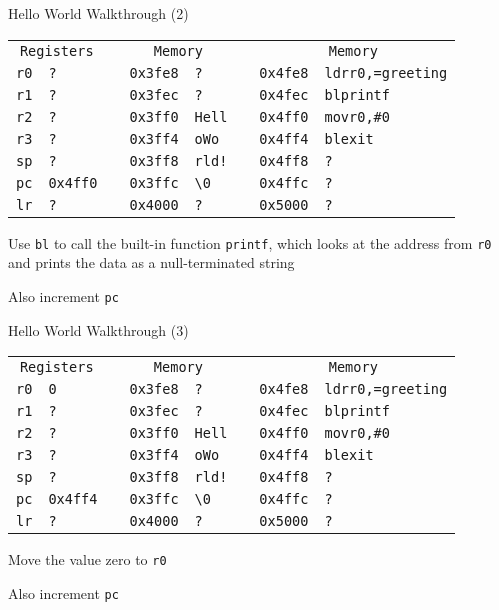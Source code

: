 \begin{frame}{Hello World Walkthrough (2)}
    \begin{alltt}
        \begin{tabular}{ r | l p{2mm} r | l p{2mm} r | l }
            \multicolumn{2}{c}{Registers} && \multicolumn{2}{c}{Memory} && \multicolumn{2}{c}{Memory} \\
            r0 & ? && 0x3fe8 & ? && 0x4fe8 & ldr r0, =greeting \\
            r1 & ? && 0x3fec & ? && 0x4fec & bl printf \\
            r2 & ? && 0x3ff0 & Hell && 0x4ff0 & mov r0, \#0 \\
            r3 & ? && 0x3ff4 & o Wo && 0x4ff4 & bl exit \\
            sp & ? && 0x3ff8 & rld! && 0x4ff8 & ? \\
            pc & 0x4ff0 && 0x3ffc & {\textbackslash}0 && 0x4ffc & ? \\
            lr & ? && 0x4000 & ? && 0x5000 & ? \\
            \end{tabular}
        \end{alltt}

        Use \texttt{bl} to call the built-in function \texttt{printf}, which looks at the address from \texttt{r0} and prints the data as a null-terminated string
        
        Also increment \texttt{pc}


\end{frame}

\begin{frame}{Hello World Walkthrough (3)}
    \begin{alltt}
        \begin{tabular}{ r | l p{2mm} r | l p{2mm} r | l }
            \multicolumn{2}{c}{Registers} && \multicolumn{2}{c}{Memory} && \multicolumn{2}{c}{Memory} \\
            r0 & 0 && 0x3fe8 & ? && 0x4fe8 & ldr r0, =greeting \\
            r1 & ? && 0x3fec & ? && 0x4fec & bl printf \\
            r2 & ? && 0x3ff0 & Hell && 0x4ff0 & mov r0, \#0 \\
            r3 & ? && 0x3ff4 & o Wo && 0x4ff4 & bl exit \\
            sp & ? && 0x3ff8 & rld! && 0x4ff8 & ? \\
            pc & 0x4ff4 && 0x3ffc & {\textbackslash}0 && 0x4ffc & ? \\
            lr & ? && 0x4000 & ? && 0x5000 & ? \\
            \end{tabular}
        \end{alltt}

        Move the value zero to \texttt{r0}

        Also increment \texttt{pc}


\end{frame}

